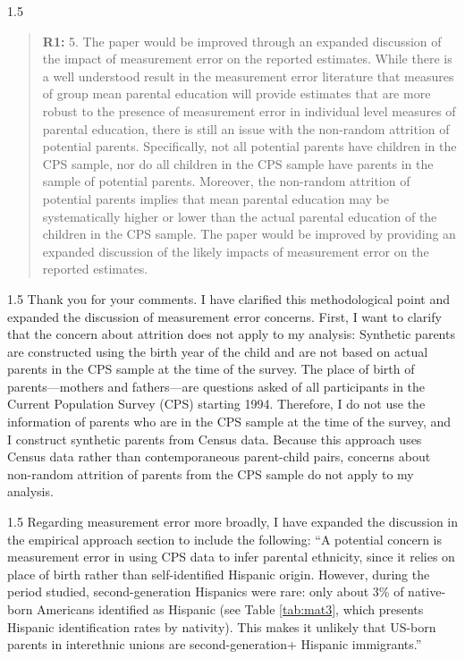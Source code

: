 \documentclass[12pt,english]{article}
\newcommand{\rrxspc}{1.5}
\begin{document}
\begin{refsection}
\begin{spacing}{\rrxspc}
\begin{quotation}
    \textbf{R1: } 5. The paper would be improved through an expanded discussion of the impact of measurement error on the reported estimates. While there is a well understood result in the measurement error literature that measures of group mean parental education will provide estimates that are more robust to the presence of measurement error in individual level measures of parental education, there is still an issue with the non-random attrition of potential parents. Specifically, not all potential parents have children in the CPS sample, nor do all children in the CPS sample have parents in the sample of potential parents. Moreover, the non-random attrition of potential parents implies that mean parental education may be systematically higher or lower than the actual parental education of the children in the CPS sample. The paper would be improved by providing an expanded discussion of the likely impacts of measurement error on the reported estimates.
    \end{quotation}
\end{spacing}
\begin{spacing}{\rrxspc}
    Thank you for your comments. I have clarified this methodological point and expanded the discussion of measurement error concerns. First, I want to clarify that the concern about attrition does not apply to my analysis: Synthetic parents are constructed using the birth year of the child and are not based on actual parents in the CPS sample at the time of the survey. The place of birth of parents---mothers and fathers---are questions asked of all participants in the Current Population Survey (CPS) starting 1994. Therefore, I do not use the information of parents who are in the CPS sample at the time of the survey, and I construct synthetic parents from Census data. Because this approach uses Census data rather than contemporaneous parent-child pairs, concerns about non-random attrition of parents from the CPS sample do not apply to my analysis. 
    \end{spacing} 

\begin{spacing}{\rrxspc}     
    Regarding measurement error more broadly, I have expanded the discussion in the empirical approach section to include the following: ``A potential concern is measurement error in using CPS data to infer parental ethnicity, since it relies on place of birth rather than self-identified Hispanic origin. However, during the period studied, second-generation Hispanics were rare: only about 3\% of native-born Americans identified as Hispanic (see Table \ref{tab:mat3}, which presents Hispanic identification rates by nativity). This makes it unlikely that US-born parents in interethnic unions are second-generation+ Hispanic immigrants.''
    \end{spacing}


\end{refsection}
\end{document}
